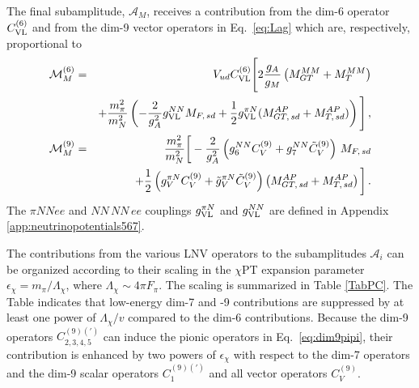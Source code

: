 \documentclass[letterpaper,11pt]{article}
\newcommand{\nn}{\nonumber}
\begin{document}
The final subamplitude, $\mathcal A_M$, receives a contribution from the dim-6 operator $C^{(6)}_{\rm VL}$ and from the dim-9 vector operators in Eq.\ \eqref{eq:Lag} which are, respectively, proportional to
\begin{eqnarray}\label{eq:vectorNMEs}
\mathcal M^{(6)}_M  &=&  V_{ud} C^{(6)}_{\rm VL } \Bigg[ 2\frac{g_A}{g_M}  \left(M_{GT}^{MM} + M_{T}^{MM} \right)
\nn\\
&&+ \frac{m^2_\pi}{m_N^2} \left( - \frac{2}{g_A^2}g^{NN}_{\rm VL}  M_{F,\, sd} 
+ \frac{1}{2} g^{\pi N}_{\rm VL} ( M^{AP}_{GT,\, sd} + M^{AP}_{T,\, sd})\right)
\Bigg]\,,\nn \\ 
\mathcal M^{(9)}_{M} & = & \frac{m_\pi^2}{m_N^2}  \bigg[  - \frac{2}{g_A^2} \left(g_6^{NN}C^{(9)}_{V}+ g_7^{NN} \tilde C^{(9)}_{V}  \right)  \, M_{F,\, sd} 
\nonumber \\
&&+ \frac{1}{2} \left(g_V^{\pi N}C_V^{(9)}+\tilde g_{V}^{\pi N} \tilde C_V^{(9)} \right)
\left( M^{AP}_{GT, \, sd}  + M^{AP}_{T, \, sd} \right) \bigg] \,.
\end{eqnarray}
The $\pi NN ee$ and $NN\, NN\, ee$ couplings  $g_{\rm VL}^{\pi N}$ and $g_{\rm VL}^{NN}$ are defined in Appendix \ref{app:neutrinopotentials567}.  


The contributions from the various LNV operators to the subamplitudes $\mathcal A_i$ can be organized according to their scaling in the $\chi$PT expansion parameter $\epsilon_\chi = m_\pi/\Lambda_\chi$, where $\Lambda_\chi \sim 4 \pi F_\pi$.
The scaling is summarized in Table \ref{TabPC}. The Table indicates that low-energy dim-7 and -9 contributions are suppressed by at least one power of $\Lambda_\chi/ v$ compared to the dim-6 contributions. Because the dim-9 operators $C^{(9)(\prime)}_{2,3,4,5}$ can induce the pionic operators in Eq.~\eqref{eq:dim9pipi}, their contribution is enhanced by two powers of $\epsilon_\chi$ with respect to the dim-7 operators and the dim-9 scalar operators $C^{(9)(\prime)}_{1}$ and all vector operators $C_V^{(9)}$.
\end{document}

